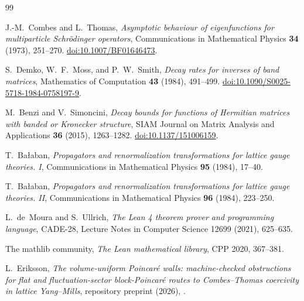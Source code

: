 \documentclass[11pt]{article}
\theoremstyle{definition}
\begin{document}
\begin{thebibliography}{99}

J.-M.~Combes and L.~Thomas,
\emph{Asymptotic behaviour of eigenfunctions for multiparticle
Schr\"odinger operators},
Communications in Mathematical Physics \textbf{34} (1973), 251--270.
\href{https://doi.org/10.1007/BF01646473}{doi:10.1007/BF01646473}.

S.~Demko, W.~F.~Moss, and P.~W.~Smith,
\emph{Decay rates for inverses of band matrices},
Mathematics of Computation \textbf{43} (1984), 491--499.
\href{https://doi.org/10.1090/S0025-5718-1984-0758197-9}
{doi:10.1090/S0025-5718-1984-0758197-9}.

M.~Benzi and V.~Simoncini,
\emph{Decay bounds for functions of Hermitian matrices with banded or
Kronecker structure},
SIAM Journal on Matrix Analysis and Applications \textbf{36} (2015),
1263--1282.
\href{https://doi.org/10.1137/151006159}{doi:10.1137/151006159}.

T.~Ba{\l}aban,
\emph{Propagators and renormalization transformations for lattice gauge
theories. I},
Communications in Mathematical Physics \textbf{95} (1984), 17--40.

T.~Ba{\l}aban,
\emph{Propagators and renormalization transformations for lattice gauge
theories. II},
Communications in Mathematical Physics \textbf{96} (1984), 223--250.

L.~de~Moura and S.~Ullrich,
\emph{The Lean 4 theorem prover and programming language},
CADE-28, Lecture Notes in Computer Science 12699 (2021), 625--635.

The mathlib community,
\emph{The Lean mathematical library},
CPP 2020, 367--381.

L.~Eriksson,
\emph{The volume-uniform Poincar\'e walls: machine-checked obstructions for
flat and fluctuation-sector block-Poincar\'e routes to Combes--Thomas
coercivity in lattice Yang--Mills},
repository preprint (2026),
.

\end{thebibliography}
\end{document}
